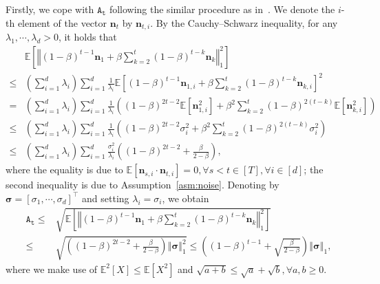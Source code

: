 \documentclass{article}
\newcommand{\E}{\mathbb{E}}
\def \bsigma {\bm{\sigma}}
\def \E {\mathbb{E}}
\newcommand{\norm}[1]{\left\Vert#1\right\Vert}
\def \bsigma {\bm{\sigma}}
\newcommand{\sqbrac}[1]{\left[#1\right]}
\newcommand{\brac}[1]{\left(#1\right)}
\def \E {\mathbb{E}}
\def \n {\mathbf{n}}
\begin{document}
Firstly, we cope with $\mathtt{A_t}$ following the similar procedure as in~\citet[Lemma~E.2]{liu2025adagrad}. We denote the $i$-th element of the vector $\n_t$ by $\n_{t,i}$. By the Cauchy–Schwarz inequality, for any $\lambda_1,\cdots,\lambda_d> 0$, it holds that
\begin{align*}
        &\E\sqbrac{\norm{(1-\beta)^{t-1}\n_1+\beta\sum_{k=2}^t(1-\beta)^{t-k}\n_k}_1^2}\\\le &\brac{\sum_{i=1}^d\lambda_i}\sum_{i=1}^d\frac{1}{\lambda_i}\E\sqbrac{(1-\beta)^{t-1}\n_{1,i}+\beta\sum_{k=2}^t(1-\beta)^{t-k}\n_{k,i}}^2\\=&\brac{\sum_{i=1}^d\lambda_i}\sum_{i=1}^d\frac{1}{\lambda_i}\brac{(1-\beta)^{2t-2}\E\sqbrac{\n_{1,i}^2}+\beta^2\sum_{k=2}^t(1-\beta)^{2(t-k)}\E\sqbrac{\n_{k,i}^2}}\\\le&\brac{\sum_{i=1}^d\lambda_i}\sum_{i=1}^d\frac{1}{\lambda_i}\brac{(1-\beta)^{2t-2}\sigma_{i}^2+\beta^2\sum_{k=2}^t(1-\beta)^{2(t-k)}\sigma_{i}^2}\\\le&\brac{\sum_{i=1}^d\lambda_i}\sum_{i=1}^d\frac{\sigma_{i}^2}{\lambda_i}\brac{(1-\beta)^{2t-2}+\frac{\beta}{2-\beta}},
    \end{align*}
where the equality is due to $\E\sqbrac{\n_{s,i}\cdot\n_{t,i}}=0,\forall s<t\in[T],\forall i\in[d]$; the second inequality is due to Assumption~\ref{asm:noise}. Denoting by $\bsigma=[\sigma_1,\cdots,\sigma_d]^\top$ and setting $\lambda_i=\sigma_i$, we obtain
\begin{align*}
    \mathtt{A_t}\le &\sqrt{\E\sqbrac{\norm{(1-\beta)^{t-1}\n_1+\beta\sum_{k=2}^t(1-\beta)^{t-k}\n_k}_1^2}}\\\le& \sqrt{\brac{(1-\beta)^{2t-2}+\frac{\beta}{2-\beta}}\norm{\bsigma}_1^2}\le\brac{(1-\beta)^{t-1}+\sqrt{\frac{\beta}{2-\beta}}}\norm{\bsigma}_1,
\end{align*}
where we make use of $\E^2[X]\le \E[X^2]$ and $\sqrt{a+b}\le \sqrt{a}+\sqrt{b},\forall a,b\ge0$.
\end{document}

